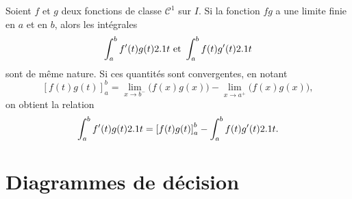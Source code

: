 \begin{subappendices}

\printindex[theoremesutilises]

\begin{theo}
\label{theo:approximationescalier}
\end{theo}

\begin{theo}
\label{theo:bijectionmonotone}
\end{theo}

\begin{theo}\label{theo:prolongementDesDerivees}
\end{theo}

\begin{theo}\label{theo:taylorresteintegral}
\end{theo}

\begin{theo}\label{theo:prolongementderivable}
\end{theo}

\begin{theo}\label{theo:ippgeneralisees}
    Soient $f$ et $g$ deux fonctions de classe $\mathscr{C}^1$ sur $I$. Si la fonction $fg$ a une limite finie en $a$ et en $b$, alors les intégrales
    \[
    \int_a^b f'(t)g(t) 2.1 t \text{ et } \int_a^b f(t) g'(t) 2.1 t
    \]
    sont de même nature. Si ces quantités sont convergentes, en notant
    \[
        [f(t)g(t)]_a^b = \lim_{x \to b^-} \big(f(x)g(x)\big) - \lim_{x \to a^+} \big(f(x)g(x)\big),
    \]
    on obtient la relation
    \[
    \int_a^b f'(t) g(t) 2.1 t = \left[f(t)g(t)\right]_a^b - \int_a^b f(t) g'(t) 2.1 t.
    \]
\end{theo}


\section{Diagrammes de décision}


\end{subappendices}
